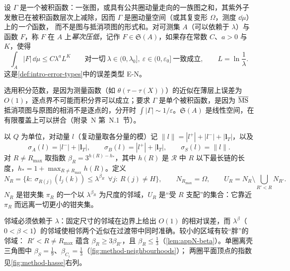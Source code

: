 \begin{definition}[积分范数意义下的幂次压低]\label{def:method-power-suppressed}
设 $\Gamma$ 是一个被积函数：一张图，或具有公共圈动量走向的一族图之和，其紫外子发散已在被积函数层次上减除，因而 $\Gamma$ 是圈动量空间（或其复变形 $\Omega$，测度 $\dd\mu$）上的\emph{一个}函数，
而不是图与抵消项图的形式和。对可测集 $A$（可以依赖于 $\lambda$）与函数 $F$，称 $F$ 在 $A$ 上\emph{幂次压低}，记作 $F\in\mathfrak S(A)$，如果存在常数 $C$、$a>0$ 与 $K$，使得
\begin{equation}\label{eq:method-EN}
\int_A|F|\,\dd\mu\le C\lambda^aL^K\qquad\text{对一切}\ \lambda\in(0,\lambda_0],\ \varepsilon\in(0,\varepsilon_0]\ \text{一致成立},\qquad L=\ln\frac1\lambda .
\end{equation}
这是\cref{def:intro-error-types}中的误差类型 E-N。
\end{definition}

选用积分范数，是因为测量函数（如 $\theta(\tau-\tau(X))$）的近似在薄层上误差为 $O(1)$，逐点界不可能而积分界可以成立；要求 $\Gamma$ 是单个被积函数，是因为
$\overline{\rm MS}$ 抵消项图与原图的相消不是逐点的，分开时 $\int|\Gamma|\sim1/\varepsilon$。$\mathfrak S(A)$ 是线性空间，在有限覆盖上可以拼合（附录~N 第~N.1~节）。

\begin{definition}\label{def:method-neighbourhoods}
以 $Q$ 为单位，对动量 $l$（复动量取各分量的模）记 $\|l\|=|l^+|+|l^-|+|\mathbf l_T|$，以及
\begin{equation}\label{eq:method-sigma}
\sigma_A(l)=|l^-|+|\mathbf l_T|,\qquad \sigma_B(l)=|l^+|+|\mathbf l_T|,\qquad \sigma_S(l)=\|l\| .
\end{equation}
对 $R\neq R_{\max}$ 取指数 $\beta_R=3^{h(R)-h_*}$，其中 $h(R)$ 是 $\mathcal R$ 中 $R$ 以下最长链的长度，$h_*=1+\max_{R\ne R_{\max}}h(R)$。定义
\begin{equation}\label{eq:method-NU}
N_R=\bigl\{k:\ \sigma_{R(j)}(l_j(k))\le\lambda^{\beta_R}\ \ \forall j:\ R(j)\neq H\bigr\},\qquad N_{R_{\max}}=\Omega,\qquad U_R=N_R\setminus\bigcup_{R'<R}N_{R'} .
\end{equation}
$N_R$ 是钳夹集 $\pi_R$ 的一个以 $\lambda^{\beta_R}$ 为尺度的邻域，$U_R$ 是“受 $R$ 支配”的集合：它靠近 $\pi_R$ 而远离一切更小的钳夹集。
\end{definition}

邻域必须依赖于 $\lambda$：固定尺寸的邻域在边界上给出 $O(1)$ 的相对误差，而 $\lambda^\beta$（$0<\beta<1$）的邻域使相邻两个近似在过渡带中同时准确。较小的区域有较“胖”的邻域：
$R'<R\neq R_{\max}$ 蕴含 $\beta_R\ge3\beta_{R'}$，且 $\beta_R\le\frac13$（\cref{lem:appN-beta}）。单圈离壳三角图中 $\beta_S=\frac19$、$\beta_{C_i}=\frac13$（\cref{fig:method-neighbourhoods}）；
两圈平面顶点的指数见\cref{fig:method-hasse}右列。

